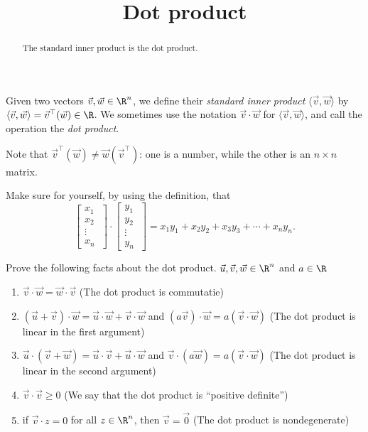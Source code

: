 \documentclass{ximera}
\title{Dot product}
\begin{document}
\begin{abstract}
  The standard inner product is the dot product.
\end{abstract}

\begin{definition}
  Given two vectors $\vec{v},\vec{w} \in \R^n$, we define their \textit{standard inner product} $\langle \vec{v}, \vec{w}\rangle$ by $\langle \vec{v},\vec{w} \rangle = \vec{v}^\top(\vec{w}) \in \R$.  We sometimes use the notation 
  $\vec{v} \cdot \vec{w}$ for $\langle \vec{v} , \vec{w} \rangle$, and call the operation the \textit{dot product}. 
\end{definition}

\begin{warning}
  Note that $\vec{v}^\top(\vec{w}) \neq \vec{w}(\vec{v}^\top)$: one is a number, while the other is an $n\times n$ matrix.
\end{warning}

\begin{question}
  Make sure for yourself, by using the definition, that 
  \[\begin{bmatrix} x_1 \\x_2\\ \vdots \\ x_n\ \end{bmatrix} \cdot \begin{bmatrix} y_1 \\y_2\\ \vdots \\ y_n\ \end{bmatrix}  = x_1y_1+x_2y_2+x_3y_3 + \cdots +x_ny_n.\]
\end{question}

Prove the following facts about the dot product.  $\vec{u},\vec{v},\vec{w} \in \R^n$ and $a \in \R$
\begin{enumerate}
\item $\vec{v} \cdot \vec{w} = \vec{w} \cdot \vec{v}$ (The dot product is commutatie)
			
\item $(\vec{u}+\vec{v})\cdot \vec{w} = \vec{u}\cdot \vec{w} + \vec{v}\cdot \vec{w}$ 	and $(a\vec{v})\cdot \vec{w} = a(\vec{v} \cdot \vec{w})$ (The dot product is linear in the first argument)
			
\item $\vec{u} \cdot (\vec{v}+\vec{w}) = \vec{u}\cdot \vec{v}+ \vec{u}\cdot \vec{w}$ and  $\vec{v} \cdot (a\vec{w}) = a(\vec{v} \cdot  \vec{w})$ (The dot product is linear in the second argument)
			
\item $\vec{v}\cdot \vec{v} \geq 0$ (We say that the dot product is ``positive definite'')
			
\item if $\vec{v} \cdot z = 0$ for all $z \in \R^n$, then $\vec{v} =\vec{0}$ (The dot product is nondegenerate)
\end{enumerate}
	
\end{document}
